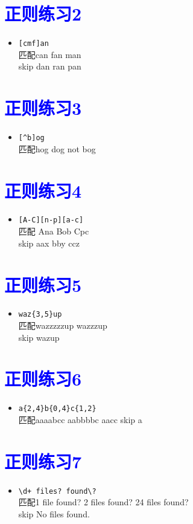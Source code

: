\documentclass{article}
\begin{document}
\section{\textcolor{blue}{正则练习2}}
\begin{itemize}
\item \verb|[cmf]an| \\ 匹配can fan man \\skip dan ran pan
\end{itemize}
\section{\textcolor{blue}{正则练习3}}
\begin{itemize}
\item \verb|[^b]og| \\ 匹配hog dog not bog
\end{itemize}
\section{\textcolor{blue}{正则练习4}}
\begin{itemize}
\item \verb|[A-C][n-p][a-c]| \\ 匹配 Ana Bob Cpc \\skip aax bby ccz
\end{itemize}
\section{\textcolor{blue}{正则练习5}}
\begin{itemize}
\item \verb|waz{3,5}up| \\ 匹配wazzzzzup wazzzup \\skip wazup
\end{itemize}
\section{\textcolor{blue}{正则练习6}}
\begin{itemize}
\item \verb|a{2,4}b{0,4}c{1,2}| \\ 匹配aaaabcc aabbbbc aacc skip a
\end{itemize}
\section{\textcolor{blue}{正则练习7}}
\begin{itemize}
\item \verb|\d+ files? found\?| \\ 匹配1 file found?  2 files found? 24 files found?
\\ skip No files found.
\end{itemize}
\end{document}
